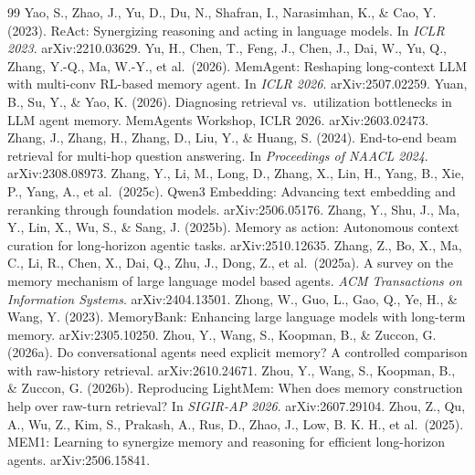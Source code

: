 \documentclass[a4paper,fleqn]{cas-sc}
\begin{document}
\begin{thebibliography}{99}
\bibitem{} Yao, S., Zhao, J., Yu, D., Du, N., Shafran, I., Narasimhan, K., \& Cao, Y. (2023). ReAct: Synergizing reasoning and acting in language models. In \emph{ICLR 2023}. arXiv:2210.03629.
\bibitem{} Yu, H., Chen, T., Feng, J., Chen, J., Dai, W., Yu, Q., Zhang, Y.-Q., Ma, W.-Y., et al.~(2026). MemAgent: Reshaping long-context LLM with multi-conv RL-based memory agent. In \emph{ICLR 2026}. arXiv:2507.02259.
\bibitem{} Yuan, B., Su, Y., \& Yao, K. (2026). Diagnosing retrieval vs.~utilization bottlenecks in LLM agent memory. MemAgents Workshop, ICLR 2026. arXiv:2603.02473.
\bibitem{} Zhang, J., Zhang, H., Zhang, D., Liu, Y., \& Huang, S. (2024). End-to-end beam retrieval for multi-hop question answering. In \emph{Proceedings of NAACL 2024}. arXiv:2308.08973.
\bibitem{} Zhang, Y., Li, M., Long, D., Zhang, X., Lin, H., Yang, B., Xie, P., Yang, A., et al.~(2025c). Qwen3 Embedding: Advancing text embedding and reranking through foundation models. arXiv:2506.05176.
\bibitem{} Zhang, Y., Shu, J., Ma, Y., Lin, X., Wu, S., \& Sang, J. (2025b). Memory as action: Autonomous context curation for long-horizon agentic tasks. arXiv:2510.12635.
\bibitem{} Zhang, Z., Bo, X., Ma, C., Li, R., Chen, X., Dai, Q., Zhu, J., Dong, Z., et al.~(2025a). A survey on the memory mechanism of large language model based agents. \emph{ACM Transactions on Information Systems}. arXiv:2404.13501.
\bibitem{} Zhong, W., Guo, L., Gao, Q., Ye, H., \& Wang, Y. (2023). MemoryBank: Enhancing large language models with long-term memory. arXiv:2305.10250.
\bibitem{} Zhou, Y., Wang, S., Koopman, B., \& Zuccon, G. (2026a). Do conversational agents need explicit memory? A controlled comparison with raw-history retrieval. arXiv:2610.24671.
\bibitem{} Zhou, Y., Wang, S., Koopman, B., \& Zuccon, G. (2026b). Reproducing LightMem: When does memory construction help over raw-turn retrieval? In \emph{SIGIR-AP 2026}. arXiv:2607.29104.
\bibitem{} Zhou, Z., Qu, A., Wu, Z., Kim, S., Prakash, A., Rus, D., Zhao, J., Low, B. K. H., et al.~(2025). MEM1: Learning to synergize memory and reasoning for efficient long-horizon agents. arXiv:2506.15841.
\end{thebibliography}
\end{document}
